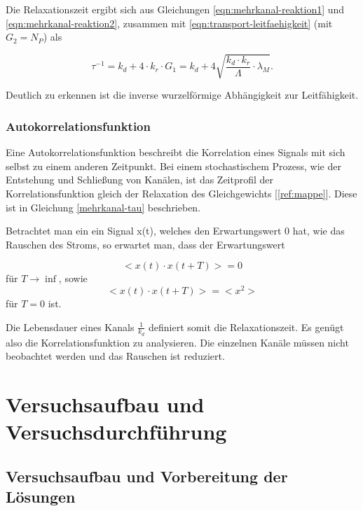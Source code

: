 \documentclass[a4paper,ngerman]{scrartcl}
\begin{document}
Die Relaxationszeit ergibt sich aus Gleichungen \ref{eqn:mehrkanal-reaktion1} und \ref{eqn:mehrkanal-reaktion2}, zusammen mit \ref{eqn:transport-leitfaehigkeit} (mit $G_2 = N_P$) als

\begin{equation}\label{mehrkanal-tau}
\tau^{-1} = k_d + 4 \cdot k_r \cdot G_1 = k_d + 4 \sqrt{\frac{k_d \cdot k_r}{\Lambda}  \cdot \lambda_M} .
\end{equation}

Deutlich zu erkennen ist die inverse wurzelförmige Abhängigkeit zur Leitfähigkeit.

\subsubsection{Autokorrelationsfunktion}

Eine Autokorrelationsfunktion beschreibt die Korrelation eines Signals mit sich selbst zu einem anderen Zeitpunkt. 
Bei einem stochastischem Prozess, wie der Entstehung und Schließung von Kanälen, ist das Zeitprofil der Korrelationsfunktion gleich der Relaxation des Gleichgewichts [\ref{ref:mappe}]. Diese ist in Gleichung \ref{mehrkanal-tau} beschrieben.

Betrachtet man ein ein Signal x(t), welches den Erwartungswert 0 hat, wie das Rauschen des Stroms, so erwartet man, dass der Erwartungswert 

\begin{equation}
<x(t) \cdot x(t+T)> = 0
\end{equation}
für $T \rightarrow \inf $, sowie
\begin{equation}
<x(t) \cdot x(t+T)> = <x^2>
\end{equation}
für $T=0$ ist. 

Die Lebensdauer eines Kanals $\frac{1}{k_d}$ definiert somit die Relaxationszeit.  Es genügt also die Korrelationsfunktion zu analysieren. Die einzelnen Kanäle müssen nicht beobachtet werden und das Rauschen ist reduziert.



\clearpage
\section{Versuchsaufbau und Versuchsdurchführung}



\subsection{Versuchsaufbau und Vorbereitung der Lösungen}
\label{sec:bilayer-vorbereitung}
\end{document}
